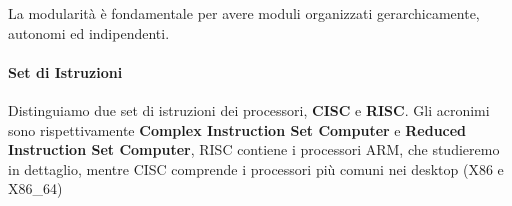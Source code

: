 La modularità è fondamentale per avere moduli organizzati gerarchicamente, autonomi ed indipendenti.

\paragraph{Set di Istruzioni}

Distinguiamo due set di istruzioni dei processori, \textbf{CISC} e \textbf{RISC}. Gli acronimi sono rispettivamente \textbf{Complex Instruction Set Computer} e \textbf{Reduced Instruction Set Computer}, RISC contiene i processori ARM, che studieremo in dettaglio, mentre CISC comprende i processori più comuni nei desktop (X86 e X86\_64)


